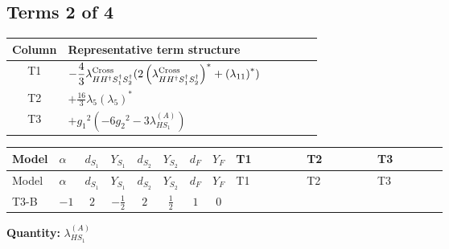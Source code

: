 \documentclass[8pt]{article}
\begin{document}
\begin{landscape}
\subsection*{Terms 2 of 4}
\begin{center}
\begin{tabular}{@{}c >{\raggedright\arraybackslash}p{0.82\linewidth}@{}}
\toprule
Column & Representative term structure \\
\midrule
T1 & \(\displaystyle -\frac{4}{3} {\lambda_{H H^\dagger S_1^\dagger S_2^\dagger}^{\rm Cross}} (2 \left({\lambda_{H H^\dagger S_1^\dagger S_2^\dagger}^{\rm Cross}}\right)^{*}+\left({\lambda_{11}}\right)^{*})\) \\
\midrule
T2 & \(\displaystyle +\frac{16}{3} {\lambda_5} \left({\lambda_5}\right)^{*}\) \\
\midrule
T3 & \(\displaystyle +{g_1}^2 \left(-6 {g_2}^2-3 {\lambda_{HS_1}^{(A)}}\right)\) \\
\midrule
\bottomrule
\end{tabular}
\end{center}
\smallskip
\tiny
\begin{longtable}{@{}llcccccc >{\raggedright\arraybackslash}p{0.21\linewidth} >{\raggedright\arraybackslash}p{0.21\linewidth} >{\raggedright\arraybackslash}p{0.21\linewidth}@{}}
\toprule
Model & $\alpha$ & $d_{S_1}$ & $Y_{S_1}$ & $d_{S_2}$ & $Y_{S_2}$ & $d_F$ & $Y_F$ & T1 & T2 & T3 \\
\midrule
\endfirsthead
\toprule
Model & $\alpha$ & $d_{S_1}$ & $Y_{S_1}$ & $d_{S_2}$ & $Y_{S_2}$ & $d_F$ & $Y_F$ & T1 & T2 & T3 \\
\midrule
\endhead
T3-B & $-1$ & $2$ & $-\frac{1}{2}$ & $2$ & $\frac{1}{2}$ & $1$ & $0$ & \scriptsize\adjustbox{max width=\linewidth}{$\begin{gathered} -\frac{4}{3} {\lambda_{H H^\dagger S_1^\dagger S_2^\dagger}^{\rm Cross}} (2 \left({\lambda_{H H^\dagger S_1^\dagger S_2^\dagger}^{\rm Cross}}\right)^{*}+\left({\lambda_{11}}\right)^{*})\end{gathered}$} & \scriptsize\adjustbox{max width=\linewidth}{$\begin{gathered} +\frac{16}{3} {\lambda_5} \left({\lambda_5}\right)^{*}\end{gathered}$} & \scriptsize\adjustbox{max width=\linewidth}{$\begin{gathered} +{g_1}^2 \left(-6 {g_2}^2-3 {\lambda_{HS_1}^{(A)}}\right)\end{gathered}$} \\
\midrule
\bottomrule
\end{longtable}
\clearpage
\noindent\textbf{Quantity: }$\lambda_{HS_1}^{(A)}$\par\smallskip

\end{landscape}
\end{document}
